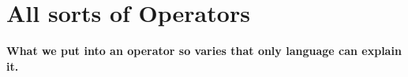 \chapter{All sorts of Operators}





\begin{center}
    \textbf{What we put into an operator so varies that only language can explain it.}
\end{center}